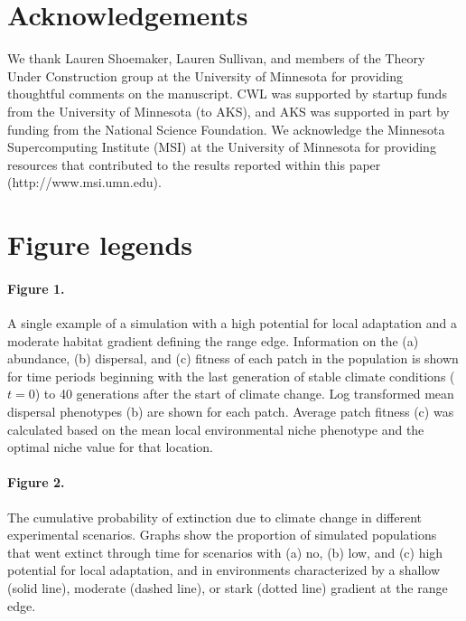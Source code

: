 \documentclass[12pt, oneside]{article}
\begin{document}
\section*{Acknowledgements}
We thank Lauren Shoemaker, Lauren Sullivan, and members of the Theory Under Construction group at the University of Minnesota for providing thoughtful comments on the manuscript. CWL was supported by startup funds from the University of Minnesota (to AKS), and AKS was supported in part by funding from the National Science Foundation. We acknowledge the Minnesota Supercomputing Institute (MSI) at the University of Minnesota for providing resources that contributed to the results reported within this paper (http://www.msi.umn.edu).




\newpage

\section*{Figure legends}
\paragraph{Figure 1.} A single example of a simulation with a high potential for local adaptation and a moderate habitat gradient defining the range edge. Information on the (a) abundance, (b) dispersal, and (c) fitness of each patch in the population is shown for time periods beginning with the last generation of stable climate conditions ($t = 0$) to 40 generations after the start of climate change. Log transformed mean dispersal phenotypes (b) are shown for each patch. Average patch fitness (c) was calculated based on the mean local environmental niche phenotype and the optimal niche value for that location.

\paragraph{Figure 2.} The cumulative probability of extinction due to climate change in different experimental scenarios. Graphs show the proportion of simulated populations that went extinct through time for scenarios with (a) no, (b) low, and (c) high potential for local adaptation, and in environments characterized by a shallow (solid line), moderate (dashed line), or stark (dotted line) gradient at the range edge.
\end{document}

